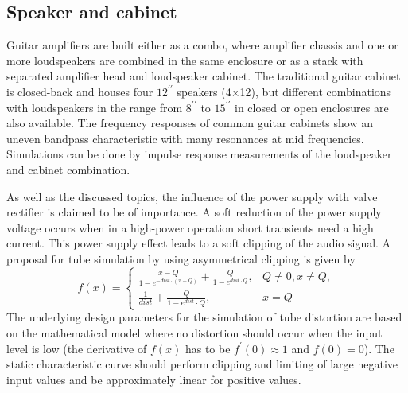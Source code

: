 \documentclass[10pt,a4paper,oneside]{article}
\begin{document}
\subsection{Speaker and cabinet} Guitar amplifiers are built either as a combo, where amplifier chassis and one or more loudspeakers are combined in the same enclosure or as a stack with separated amplifier head and loudspeaker cabinet. The traditional guitar cabinet is closed-back and houses four $12^{\prime \prime}$ speakers (4×12), but different combinations with loudspeakers in the range from $8^{\prime \prime}$ to $15^{\prime \prime}$ in closed or open enclosures are also available. The frequency responses of common guitar cabinets show an uneven bandpass characteristic with many resonances at mid frequencies. Simulations can be done by impulse response measurements of the loudspeaker and cabinet combination.

As well as the discussed topics, the influence of the power supply with valve rectifier is claimed to be of importance. A soft reduction of the power supply voltage occurs when in a high-power operation short transients need a high current. This power supply effect leads to a soft clipping of the audio signal. A proposal for tube simulation by using asymmetrical clipping is given by
\[
f(x)=\left\{\begin{array}{ll}{\frac{x-Q}{1-e^{-d i s t \cdot(x-Q)}}+\frac{Q}{1-e^{d i s t \cdot Q}},} & {Q \neq 0, x \neq Q,} \\ {\frac{1}{d i s t}+\frac{Q}{1-e^{d i s t} \cdot Q},} & {x=Q}\end{array}\right.
\]
The underlying design parameters for the simulation of tube distortion are based on the mathematical model where no distortion should occur when the input level is low (the derivative of $f(x)$ has to be $f^{\prime}(0) \approx 1$ and $f(0)=0$). The static characteristic curve should perform clipping and limiting of large negative input values and be approximately linear for positive values. 
\end{document}
